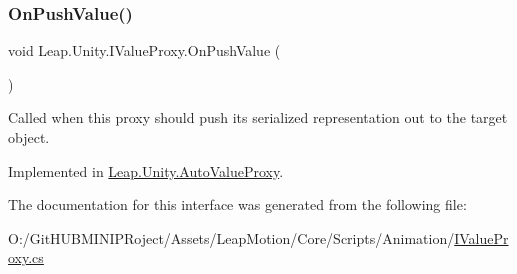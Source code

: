\subsubsection{\texorpdfstring{OnPushValue()}{OnPushValue()}}
{\footnotesize\ttfamily void Leap.\+Unity.\+I\+Value\+Proxy.\+On\+Push\+Value (\begin{DoxyParamCaption}{ }\end{DoxyParamCaption})}



Called when this proxy should push its serialized representation out to the target object. 



Implemented in \mbox{\hyperlink{class_leap_1_1_unity_1_1_auto_value_proxy_a4a538b6c13f9d3a961937652098fc9b3}{Leap.\+Unity.\+Auto\+Value\+Proxy}}.



The documentation for this interface was generated from the following file\+:\begin{DoxyCompactItemize}
\item 
O\+:/\+Git\+H\+U\+B\+M\+I\+N\+I\+P\+Roject/\+Assets/\+Leap\+Motion/\+Core/\+Scripts/\+Animation/\mbox{\hyperlink{_i_value_proxy_8cs}{I\+Value\+Proxy.\+cs}}\end{DoxyCompactItemize}
